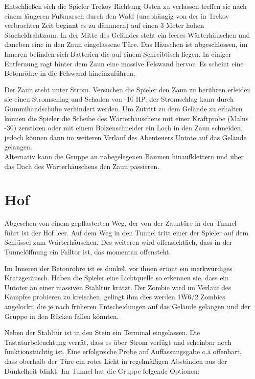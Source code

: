 Entschließen sich die Spieler Trekov Richtung Osten zu verlassen treffen sie nach einem längeren Fußmarsch durch den Wald (unabhängig von der in Trekov verbrachten Zeit beginnt es zu dämmern) auf einen 3 Meter hohen Stacheldrahtzaun.
In der Mitte des Geländes steht ein leeres Wärterhäuschen und daneben eine in den Zaun eingelassene Türe. Das Häuschen ist abgeschlossen, im Inneren befinden sich Batterien die auf einem Schreibtisch liegen.
In einiger Entfernung ragt hinter dem Zaun eine massive Felswand hervor. Es scheint eine Betonröhre in die Felswand hineinzuführen.

Der Zaun steht unter Strom. Versuchen die Spieler den Zaun zu berühren erleiden sie einen Stromschlag und Schaden von -10 HP, der Stromschlag kann durch Gummihandschuhe verhindert werden.
Um Zutritt zu dem Gelände zu erhalten können die Spieler die Scheibe des Wärterhäuschens mit einer Kraftprobe (Malus -30) zerstören oder mit einem Bolzenschneider ein Loch in den Zaun schneiden, jedoch können dann im weiteren Verlauf des Abenteuers Untote auf das Gelände gelangen.
\\Alternativ kann die Gruppe an nahegelegenen Bäumen hinaufklettern und über das Dach des Wärterhäuschens den Zaun passieren.

\section{Hof}

Abgesehen von einem gepflasterten Weg, der von der Zauntüre in den Tunnel führt ist der Hof leer. Auf dem Weg in den Tunnel tritt einer der Spieler auf dem Schlüssel zum Wärterhäuschen. Des weiteren wird offensichtlich, dass in der Tunnelöffnung ein Falltor ist, das momentan offensteht.

Im Inneren der Betonröhre ist es dunkel, vor ihnen ertönt ein merkwürdiges Kratzgeräusch. Haben die Spieler eine Lichtquelle so erkennen sie, dass ein Untoter an einer massiven Stahltür kratzt.
Der Zombie wird im Verlauf des Kampfes probieren zu kreischen, gelingt ihm dies werden 1W6/2 Zombies angelockt, die je nach früheren Entscheidungen auf das Gelände gelangen und der Gruppe in den Rücken fallen könnten.


%  

Neben der Stahltür ist in den Stein ein Terminal eingelassen. Die Tastaturbeleuchtung verrät, dass es über Strom verfügt und scheinbar noch funktionstüchtig ist.
Eine erfolgreiche Probe auf Auffassungsgabe o.ä offenbart, dass oberhalb der Türe ein rotes Licht in regelmäßigen Abständen aus der Dunkelheit blinkt.
Im Tunnel hat die Gruppe folgende Optionen:

